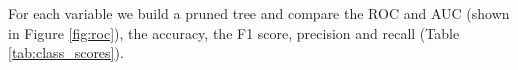 \documentclass[a4paper,11pt,dvipsnames]{article}
\begin{document}
\begin{table}[h]
            \caption{Thresholds used for the binary split}\label{tab:threshold}
    \end{table}


For each variable we build a pruned tree and compare the ROC and AUC (shown in Figure \ref{fig:roc}), the accuracy, the F1 score, precision and recall (Table \ref{tab:class_scores}).
\end{document}
